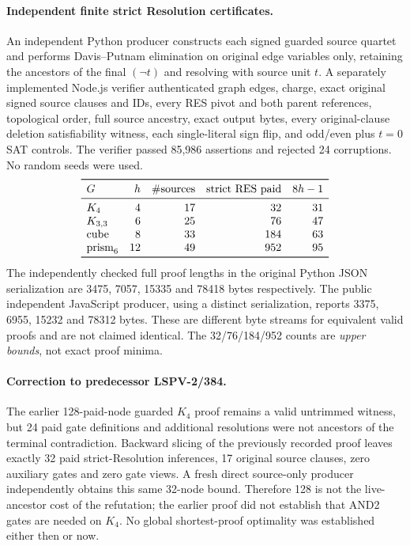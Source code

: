 \documentclass[11pt]{article}
\begin{document}
\paragraph{Independent finite strict Resolution certificates.}
An independent Python producer constructs each signed guarded source quartet and performs Davis--Putnam elimination on original edge variables only, retaining the ancestors of the final $(\neg t)$ and resolving with source unit $t$. A separately implemented Node.js verifier authenticated graph edges, charge, exact original signed source clauses and IDs, every RES pivot and both parent references, topological order, full source ancestry, exact output bytes, every original-clause deletion satisfiability witness, each single-literal sign flip, and odd/even plus $t=0$ SAT controls. The verifier passed 85,986 assertions and rejected 24 corruptions. No random seeds were used.
\[
\begin{array}{lrrrr}
\toprule
G & h & \#\text{sources} & \text{strict RES paid} & 8h-1\\
\midrule
K_4&4&17&32&31\\
K_{3,3}&6&25&76&47\\
\text{cube}&8&33&184&63\\
\text{prism}_6&12&49&952&95\\
\bottomrule
\end{array}
\]
The independently checked full proof lengths in the original Python JSON serialization are 3475, 7057, 15335 and 78418 bytes respectively. The public independent JavaScript producer, using a distinct serialization, reports 3375, 6955, 15232 and 78312 bytes. These are different byte streams for equivalent valid proofs and are not claimed identical. The 32/76/184/952 counts are \emph{upper bounds}, not exact proof minima.

\paragraph{Correction to predecessor LSPV-2/384.}
The earlier 128-paid-node guarded $K_4$ proof remains a valid untrimmed witness, but 24 paid gate definitions and additional resolutions were not ancestors of the terminal contradiction. Backward slicing of the previously recorded proof leaves exactly 32 paid strict-Resolution inferences, 17 original source clauses, zero auxiliary gates and zero gate views. A fresh direct source-only producer independently obtains this same 32-node bound. Therefore 128 is not the live-ancestor cost of the refutation; the earlier proof did not establish that AND2 gates are needed on $K_4$. No global shortest-proof optimality was established either then or now.
\end{document}
